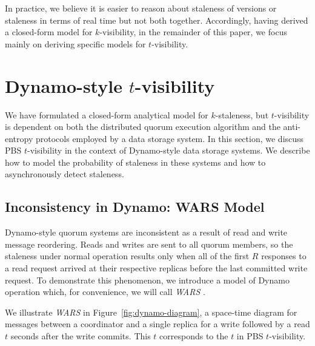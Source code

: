 \documentclass{vldb}
\begin{document}
In practice, we believe it is easier to reason about staleness of
versions or staleness in terms of real time but not both together.
Accordingly, having derived a closed-form model for $k$-visibility, in
the remainder of this paper, we focus mainly on deriving specific models
for $t$-visibility.

\section{Dynamo-style $t$-visibility}
\label{sec:dynamo}

We have formulated a closed-form analytical model for $k$-staleness,
but $t$-visibility is dependent on both the distributed quorum
execution algorithm and the anti-entropy protocols employed by a data
storage system.  In this section, we discuss PBS $t$-visibility in the
context of Dynamo-style data storage systems.  We describe how to
model the probability of staleness in these systems and how to
asynchronously detect staleness.

\subsection{Inconsistency in Dynamo: WARS Model}

Dynamo-style quorum systems are inconsistent as a result of read and
write message reordering.  Reads and writes are sent to all quorum
members, so the staleness under normal operation results only when all
of the first $R$ responses to a read request arrived at their
respective replicas before the last committed write request.  To
demonstrate this phenomenon, we introduce a model of Dynamo operation
which, for convenience, we will call \textit{WARS} .

We illustrate \textit{WARS} in Figure~\ref{fig:dynamo-diagram}, a
space-time diagram for messages between a coordinator and a single
replica for a write followed by a read $t$ seconds after the write
commits.  This $t$ corresponds to the $t$ in PBS $t$-visibility.
\end{document}
